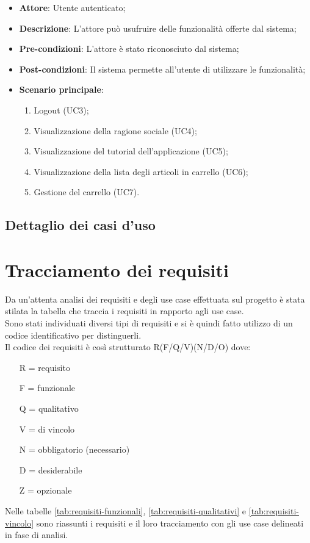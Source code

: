 \begin{itemize}
	\item \textbf{Attore}: Utente autenticato;
	\item \textbf{Descrizione}: L'attore può usufruire delle funzionalità offerte dal sistema;
	\item \textbf{Pre-condizioni}: L'attore è stato riconosciuto dal sistema;
	\item \textbf{Post-condizioni}: Il sistema permette all'utente di utilizzare le funzionalità;
	\item \textbf{Scenario principale}: 
		\begin{enumerate}
			\item Logout (UC3);
			\item Visualizzazione della ragione sociale (UC4);
			\item Visualizzazione del tutorial dell'applicazione (UC5);
			\item Visualizzazione della lista degli articoli in carrello (UC6);
			\item Gestione del carrello (UC7).
		\end{enumerate}
\end{itemize}

\newpage

\subsection{Dettaglio dei casi d'uso}


\section{Tracciamento dei requisiti}

Da un'attenta analisi dei requisiti e degli use case effettuata sul progetto è stata stilata la tabella che traccia i requisiti in rapporto agli use case.\\
Sono stati individuati diversi tipi di requisiti e si è quindi fatto utilizzo di un codice identificativo per distinguerli.\\
Il codice dei requisiti è così strutturato R(F/Q/V)(N/D/O) dove:
\begin{enumerate}
	\item[R =] requisito
    \item[F =] funzionale
    \item[Q =] qualitativo
    \item[V =] di vincolo
    \item[N =] obbligatorio (necessario)
    \item[D =] desiderabile
    \item[Z =] opzionale
\end{enumerate}
Nelle tabelle \ref{tab:requisiti-funzionali}, \ref{tab:requisiti-qualitativi} e \ref{tab:requisiti-vincolo} sono riassunti i requisiti e il loro tracciamento con gli use case delineati in fase di analisi.

